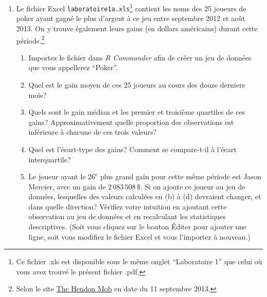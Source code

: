 \documentclass[12pt]{article}
\begin{document}
\begin{enumerate}
\item Le fichier Excel {\tt laboratoire1a.xls}\footnote{Ce fichier .xls est disponible sous le même onglet ``Laboratoire 1'' que celui où vous avez trouvé le présent fichier .pdf.} contient les noms des 25 joueurs de poker ayant gagné le plus d'argent à ce jeu entre septembre 2012 et août 2013. On y trouve également leurs gains (en dollars américains) durant cette période.\footnote{Selon le site \href{http://pokerdb.thehendonmob.com/rankings}{The Hendon Mob} en date du 11 septembre 2013.}
\begin{enumerate}
\item Importez le fichier dans {\it R Commander} afin de créer un jeu de données que vous appellerez ``Poker''.
\item Quel est le gain moyen de ces 25 joueurs au cours des douze derniers mois?
\item Quels sont le gain médian et les premier et troisième quartiles de ces gains? Approximativement quelle proportion des observations est inférieure à chacune de ces trois valeurs?
\item Quel est l'écart-type des gains? Comment se compare-t-il à l'écart interquartile?
\item Le joueur ayant le $26^{\mbox{e}}$ plus grand gain pour cette même période est Jason Mercier, avec un gain de  $2\,083\,508\,\$ $. Si on ajoute ce joueur au jeu de données, lesquelles des valeurs calculées en (b) à (d) devraient changer, et dans quelle direction? Vérifiez votre intuition en ajoutant cette observation au jeu de données et en recalculant les statistiques descriptives. (Soit vous cliquez sur le bouton Éditer pour ajouter une ligne, soit vous modifiez le fichier Excel et vous l'importez à nouveau.)
\end{enumerate}

\vspace{5mm}



\end{enumerate}
\end{document}
